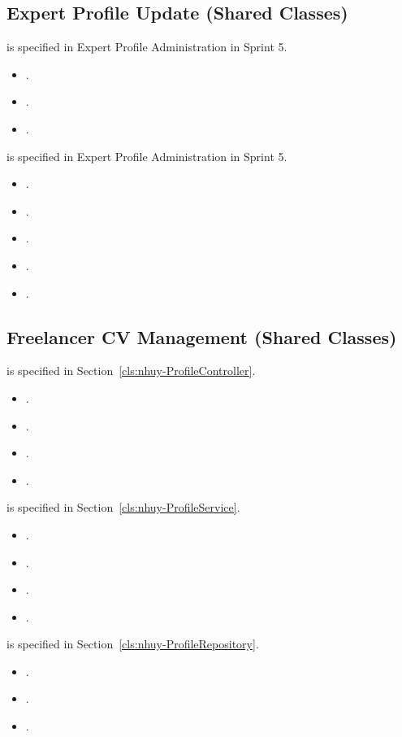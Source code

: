 \subsection{Expert Profile Update (Shared Classes)}

 is specified in Expert Profile Administration in Sprint 5.
\begin{itemize}[nosep]
\item {}.
\item {}.
\item {}.
\end{itemize}

 is specified in Expert Profile Administration in Sprint 5.
\begin{itemize}[nosep]
\item {}.
\item {}.
\item {}.
\item {}.
\item {}.
\end{itemize}

\subsection{Freelancer CV Management (Shared Classes)}

 is specified in Section~\ref{cls:nhuy-ProfileController}.
\begin{itemize}[nosep]
\item {}.
\item {}.
\item {}.
\item {}.
\end{itemize}

 is specified in Section~\ref{cls:nhuy-ProfileService}.
\begin{itemize}[nosep]
\item {}.
\item {}.
\item {}.
\item {}.
\end{itemize}

 is specified in Section~\ref{cls:nhuy-ProfileRepository}.
\begin{itemize}[nosep]
\item {}.
\item {}.
\item {}.
\end{itemize}
